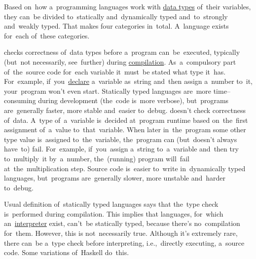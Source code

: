 Based on~how a~programming languages work with \hyperref[datatypes]{data types} of~their variables, they can~be divided to~statically and~dynamically typed and~to~strongly and~weakly typed.
That makes four categories in~total.
A~language exists for~each of~these categories.

\begin{itemize}
     checks correctness of~data types before a~program can~be~executed, typically (but~not necessarily, see~further) during \hyperref[compiledinterpretedlanguages]{compilation}.
            As~a~compulsory part of~the~source code for~each variable it~must~be stated what type it~has.
            For~example, if~you~\hyperref[declarationdefinition]{declare} a~variable as~string and~then assign a~number to~it, your~program won't even start.
            Statically typed languages are~more time--consuming during development (the~code is~more verbose), but~programs are~generally faster, more stable and~easier to~debug.
     doesn't check correctness of~data.
            A~type of~a~variable is~decided at~program runtime based on~the~first assignment of~a~value to~that~variable.
            When later in~the~program some other type value is~assigned to~the~variable, the~program can (but~doesn't always have~to) fail.
            For~example, if~you~assign a~string to~a~variable and~then try to~multiply~it by~a~number, the~(running) program will~fail at~the~multiplication step.
            Source code is~easier to~write in~dynamically typed languages, but~programs are~generally slower, more unstable and~harder to~debug.
\end{itemize}

\warningnonl Usual definition of~statically typed languages says that the~type check is~performed during compilation.
This implies that languages, for~which an~\hyperref[compiledinterpretedlanguages]{interpreter} exist, can't~be statically typed, because there's no~compilation for~them.
However, this is not~necessarily true.
Although it's extremely rare, there can~be a~type check before interpreting, i.e.,~directly executing, a~source code.
Some variations of~Haskell do~this.

